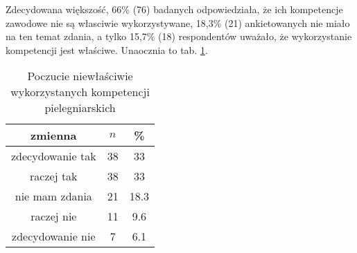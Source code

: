 

Zdecydowana większość, 66\% (76) badanych odpowiedziała, że ich kompetencje zawodowe nie są własciwie wykorzystywane, 18,3\% (21) ankietowanych nie miało na ten temat zdania, a tylko 15,7\% (18)  respondentów uważało, że wykorzystanie kompetencji jest właściwe. Unaocznia to tab. \ref{tab:Q21}.



\begin{table}[H]
\caption{Poczucie niewłaściwie wykorzystanych kompetencji pielegniarskich}
\centering
\begin{tabular}{ | c | c | c |}
\hline
zmienna & $n$ & \% \\
\hline
zdecydowanie tak  &  38  & 33 \\
\hline
raczej tak  &  38  & 33 \\
\hline
nie mam zdania  &  21  & 18.3 \\
\hline
raczej nie  &  11  & 9.6 \\
\hline
zdecydowanie nie  &  7  & 6.1\\
\hline
\end{tabular}
\label{tab:Q21}
\end{table}
